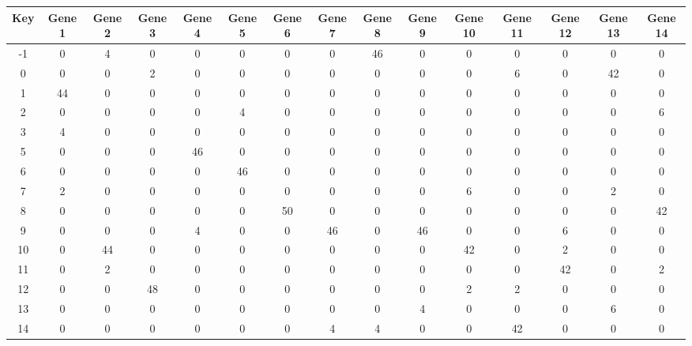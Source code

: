 \begin{tabular}{|c|c|c|c|c|c|c|c|c|c|c|c|c|c|c|}
\hline
Key & Gene 1 & Gene 2 & Gene 3 & Gene 4 & Gene 5 & Gene 6 & Gene 7 & Gene 8 & Gene 9 & Gene 10 & Gene 11 & Gene 12 & Gene 13 & Gene 14 \\
\hline
-1 & 0 & 4 & 0 & 0 & 0 & 0 & 0 & 46 & 0 & 0 & 0 & 0 & 0 & 0 \\
0 & 0 & 0 & 2 & 0 & 0 & 0 & 0 & 0 & 0 & 0 & 6 & 0 & 42 & 0 \\
1 & 44 & 0 & 0 & 0 & 0 & 0 & 0 & 0 & 0 & 0 & 0 & 0 & 0 & 0 \\
2 & 0 & 0 & 0 & 0 & 4 & 0 & 0 & 0 & 0 & 0 & 0 & 0 & 0 & 6 \\
3 & 4 & 0 & 0 & 0 & 0 & 0 & 0 & 0 & 0 & 0 & 0 & 0 & 0 & 0 \\
5 & 0 & 0 & 0 & 46 & 0 & 0 & 0 & 0 & 0 & 0 & 0 & 0 & 0 & 0 \\
6 & 0 & 0 & 0 & 0 & 46 & 0 & 0 & 0 & 0 & 0 & 0 & 0 & 0 & 0 \\
7 & 2 & 0 & 0 & 0 & 0 & 0 & 0 & 0 & 0 & 6 & 0 & 0 & 2 & 0 \\
8 & 0 & 0 & 0 & 0 & 0 & 50 & 0 & 0 & 0 & 0 & 0 & 0 & 0 & 42 \\
9 & 0 & 0 & 0 & 4 & 0 & 0 & 46 & 0 & 46 & 0 & 0 & 6 & 0 & 0 \\
10 & 0 & 44 & 0 & 0 & 0 & 0 & 0 & 0 & 0 & 42 & 0 & 2 & 0 & 0 \\
11 & 0 & 2 & 0 & 0 & 0 & 0 & 0 & 0 & 0 & 0 & 0 & 42 & 0 & 2 \\
12 & 0 & 0 & 48 & 0 & 0 & 0 & 0 & 0 & 0 & 2 & 2 & 0 & 0 & 0 \\
13 & 0 & 0 & 0 & 0 & 0 & 0 & 0 & 0 & 4 & 0 & 0 & 0 & 6 & 0 \\
14 & 0 & 0 & 0 & 0 & 0 & 0 & 4 & 4 & 0 & 0 & 42 & 0 & 0 & 0 \\
\hline
\end{tabular}